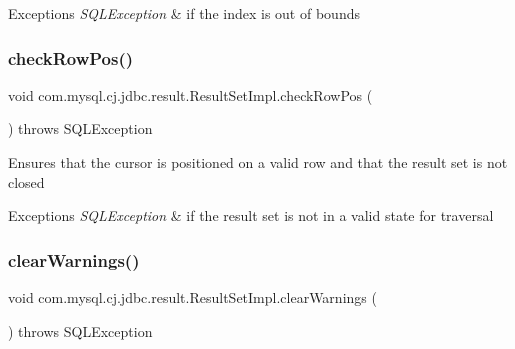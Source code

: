 \begin{DoxyExceptions}{Exceptions}
{\em S\+Q\+L\+Exception} & if the index is out of bounds \\
\hline
\end{DoxyExceptions}
\mbox{\label{classcom_1_1mysql_1_1cj_1_1jdbc_1_1result_1_1_result_set_impl_ab264cbfab311f9cbf06129d88ee25664}} 
\subsubsection{\texorpdfstring{check\+Row\+Pos()}{checkRowPos()}}
{\footnotesize\ttfamily void com.\+mysql.\+cj.\+jdbc.\+result.\+Result\+Set\+Impl.\+check\+Row\+Pos (\begin{DoxyParamCaption}{ }\end{DoxyParamCaption}) throws S\+Q\+L\+Exception\hspace{0.3cm}{\ttfamily [protected]}}

Ensures that the cursor is positioned on a valid row and that the result set is not closed


\begin{DoxyExceptions}{Exceptions}
{\em S\+Q\+L\+Exception} & if the result set is not in a valid state for traversal \\
\hline
\end{DoxyExceptions}
\mbox{\label{classcom_1_1mysql_1_1cj_1_1jdbc_1_1result_1_1_result_set_impl_aa785bccb5adae1c8f447ccd47cd92ec6}} 
\subsubsection{\texorpdfstring{clear\+Warnings()}{clearWarnings()}}
{\footnotesize\ttfamily void com.\+mysql.\+cj.\+jdbc.\+result.\+Result\+Set\+Impl.\+clear\+Warnings (\begin{DoxyParamCaption}{ }\end{DoxyParamCaption}) throws S\+Q\+L\+Exception}

